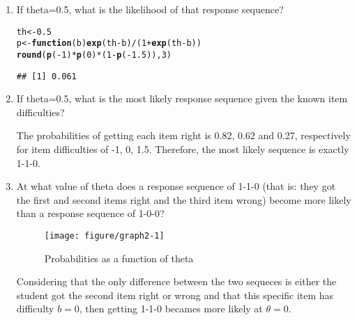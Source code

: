 \documentclass{article}\usepackage[]{graphicx}\usepackage[]{color}
\makeatletter
\def\maxwidth{ %
  \ifdim\Gin@nat@width>\linewidth
    \linewidth
  \else
    \Gin@nat@width
  \fi
}
\newcommand{\hlnum}[1]{\textcolor[rgb]{0.686,0.059,0.569}{#1}}%
\newcommand{\hlopt}[1]{\textcolor[rgb]{0,0,0}{#1}}%
\newcommand{\hlstd}[1]{\textcolor[rgb]{0.345,0.345,0.345}{#1}}%
\newcommand{\hlkwa}[1]{\textcolor[rgb]{0.161,0.373,0.58}{\textbf{#1}}}%
\newcommand{\hlkwb}[1]{\textcolor[rgb]{0.69,0.353,0.396}{#1}}%
\newcommand{\hlkwc}[1]{\textcolor[rgb]{0.333,0.667,0.333}{#1}}%
\newcommand{\hlkwd}[1]{\textcolor[rgb]{0.737,0.353,0.396}{\textbf{#1}}}%
\newenvironment{kframe}{%
 \def\at@end@of@kframe{}%
 \ifinner\ifhmode%
  \def\at@end@of@kframe{\end{minipage}}%
  \begin{minipage}{\columnwidth}%
 \fi\fi%
 \def\FrameCommand##1{\hskip\@totalleftmargin \hskip-\fboxsep
 \colorbox{shadecolor}{##1}\hskip-\fboxsep
     \hskip-\linewidth \hskip-\@totalleftmargin \hskip\columnwidth}%
 \MakeFramed {\advance\hsize-\width
   \@totalleftmargin\z@ \linewidth\hsize
   \@setminipage}}%
 {\par\unskip\endMakeFramed%
 \at@end@of@kframe}
\newenvironment{knitrout}{}{} %
\makeatother
\begin{document}
\begin{enumerate}
\begin{knitrout}
\end{knitrout}

\item If theta=0.5, what is the likelihood of that response sequence?

\begin{knitrout}
\color{fgcolor}\begin{kframe}
\begin{alltt}
\hlstd{th}\hlkwb{<-}\hlnum{0.5}
\hlstd{p}\hlkwb{<-}\hlkwa{function}\hlstd{(}\hlkwc{b}\hlstd{)} \hlkwd{exp}\hlstd{(th}\hlopt{-}\hlstd{b)}\hlopt{/}\hlstd{(}\hlnum{1}\hlopt{+}\hlkwd{exp}\hlstd{(th}\hlopt{-}\hlstd{b))}
\hlkwd{round}\hlstd{(}\hlkwd{p}\hlstd{(}\hlopt{-}\hlnum{1}\hlstd{)}\hlopt{*}\hlkwd{p}\hlstd{(}\hlnum{0}\hlstd{)}\hlopt{*}\hlstd{(}\hlnum{1}\hlopt{-}\hlkwd{p}\hlstd{(}\hlopt{-}\hlnum{1.5}\hlstd{)),}\hlnum{3}\hlstd{)}
\end{alltt}
\begin{verbatim}
## [1] 0.061
\end{verbatim}
\end{kframe}
\end{knitrout}

\item If theta=0.5, what is the most likely response sequence given the known item difficulties? 

The probabilities of getting each item right is 0.82, 0.62 and 0.27, respectively for item difficulties of -1, 0, 1.5. Therefore, the most likely sequence is exactly 1-1-0.

\item At what value of theta does a response sequence of 1-1-0 (that is: they got the first and second items right and the third item wrong) become more likely than a response sequence of 1-0-0?

\begin{knitrout}
\color{fgcolor}\begin{figure}[H]

{\centering \texttt{[image: figure/graph2-1]} 

}

\caption[Probabilities as a function of theta]{Probabilities as a function of theta}\label{fig:graph2}
\end{figure}


\end{knitrout}

Considering that the only difference between the two sequeces is either the student got the second item right or wrong and that this specific item has difficulty $b = 0$, then getting 1-1-0 becames more likely at $\theta = 0$.


\end{enumerate}
\end{document}

